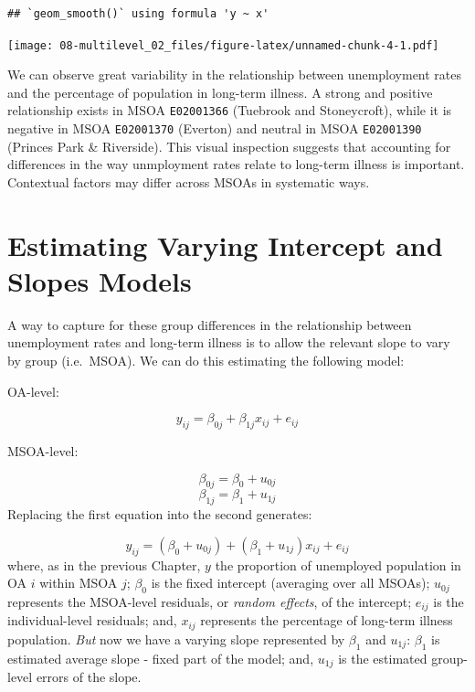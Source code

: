\documentclass[
]{book}
\begin{document}
\begin{verbatim}
## `geom_smooth()` using formula 'y ~ x'
\end{verbatim}

\texttt{[image: 08-multilevel\_02\_files/figure-latex/unnamed-chunk-4-1.pdf]}

We can observe great variability in the relationship between unemployment rates and the percentage of population in long-term illness. A strong and positive relationship exists in MSOA \texttt{E02001366} (Tuebrook and Stoneycroft), while it is negative in MSOA \texttt{E02001370} (Everton) and neutral in MSOA \texttt{E02001390} (Princes Park \& Riverside). This visual inspection suggests that accounting for differences in the way unmployment rates relate to long-term illness is important. Contextual factors may differ across MSOAs in systematic ways.

\hypertarget{estimating-varying-intercept-and-slopes-models}{%
\section{Estimating Varying Intercept and Slopes Models}\label{estimating-varying-intercept-and-slopes-models}}

A way to capture for these group differences in the relationship between unemployment rates and long-term illness is to allow the relevant slope to vary by group (i.e.~MSOA). We can do this estimating the following model:

OA-level:

\[y_{ij} = \beta_{0j} + \beta_{1j}x_{ij} + e_{ij}\]

MSOA-level:

\[\beta_{0j} = \beta_{0} + u_{0j}\]
\[\beta_{1j} = \beta_{1} + u_{1j} \]
Replacing the first equation into the second generates:

\[y_{ij} = (\beta_{0} + u_{0j}) + (\beta_{1} + u_{1j})x_{ij} + e_{ij}\]
where, as in the previous Chapter, \(y\) the proportion of unemployed population in OA \(i\) within MSOA \(j\); \(\beta_{0}\) is the fixed intercept (averaging over all MSOAs); \(u_{0j}\) represents the MSOA-level residuals, or \emph{random effects}, of the intercept; \(e_{ij}\) is the individual-level residuals; and, \(x_{ij}\) represents the percentage of long-term illness population. \emph{But} now we have a varying slope represented by \(\beta_{1}\) and \(u_{1j}\): \(\beta_{1}\) is estimated average slope - fixed part of the model; and, \(u_{1j}\) is the estimated group-level errors of the slope.
\end{document}
